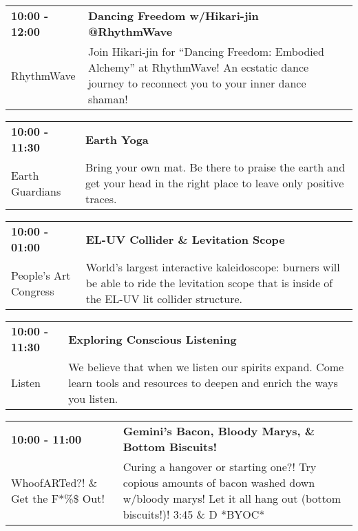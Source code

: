 \begin{tabular}{ p{1in} p{2.2in} }
    \textbf{10:00 - 12:00} & \textbf{Dancing Freedom w/Hikari-jin @RhythmWave} \\
    RhythmWave \newline  & Join Hikari-jin for ``Dancing Freedom: Embodied Alchemy'' at RhythmWave! An ecstatic dance journey to reconnect you to your inner dance shaman! \\
    \hline 
\end{tabular}
    
\begin{tabular}{ p{1in} p{2.2in} }
    \textbf{10:00 - 11:30} & \textbf{Earth Yoga} \\
    Earth Guardians \newline  & Bring your own mat. Be there to praise the earth and get your head in the right place to leave only positive traces. \\
    \hline 
\end{tabular}
    
\begin{tabular}{ p{1in} p{2.2in} }
    \textbf{10:00 - 01:00} & \textbf{EL-UV Collider \& Levitation Scope} \\
    People's Art Congress \newline  & World's largest interactive kaleidoscope: burners will be able to ride the levitation scope that is inside of the EL-UV lit collider structure. \\
    \hline 
\end{tabular}
    
\begin{tabular}{ p{1in} p{2.2in} }
    \textbf{10:00 - 11:30} & \textbf{Exploring Conscious Listening} \\
    Listen \newline  & We believe that when we listen our spirits expand. Come learn tools and resources to deepen and enrich the ways you listen. \\
    \hline 
\end{tabular}
    
\begin{tabular}{ p{1in} p{2.2in} }
    \textbf{10:00 - 11:00} & \textbf{Gemini's Bacon, Bloody Marys, \& Bottom Biscuits!} \\
    WhoofARTed?! \& Get the F*\%\$ Out! \newline  & Curing a hangover or starting one?! Try copious amounts of bacon washed down w/bloody marys! Let it all hang out (bottom biscuits!)! 3:45 \& D *BYOC* \\
    \hline 
\end{tabular}
    
